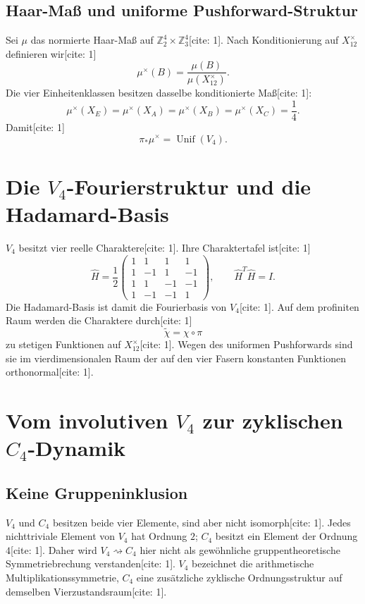 \documentclass[11pt,a4paper]{article}
\newcommand{\ZZ}{\mathbb{Z}}
\newcommand{\Unif}{\operatorname{Unif}}
\begin{document}
	\subsection{Haar-Maß und uniforme Pushforward-Struktur}
	Sei $\mu$ das normierte Haar-Maß auf $\ZZ_2^4\times\ZZ_3^4$[cite: 1]. Nach Konditionierung auf $X_{12}^{\times}$ definieren wir[cite: 1]
	\[
	\mu^\times(B)=\frac{\mu(B)}{\mu(X_{12}^{\times})}.
	\]
	Die vier Einheitenklassen besitzen dasselbe konditionierte Maß[cite: 1]:
	\[
	\mu^\times(X_E)=\mu^\times(X_A)=\mu^\times(X_B)=\mu^\times(X_C)=\frac14.
	\]
	Damit[cite: 1]
	\[
	\boxed{\pi_*\mu^\times=\Unif(V_4).}
	\]
	
	\section{Die $V_4$-Fourierstruktur und die Hadamard-Basis}
	$V_4$ besitzt vier reelle Charaktere[cite: 1]. Ihre Charaktertafel ist[cite: 1]
	\[
	\widehat H=\frac12
	\begin{pmatrix}
		1&1&1&1\\
		1&-1&1&-1\\
		1&1&-1&-1\\
		1&-1&-1&1
	\end{pmatrix},\qquad \widehat H^T\widehat H=I.
	\]
	Die Hadamard-Basis ist damit die Fourierbasis von $V_4$[cite: 1]. Auf dem profiniten Raum werden die Charaktere durch[cite: 1]
	\[
	\widetilde\chi=\chi\circ\pi
	\]
	zu stetigen Funktionen auf $X_{12}^{\times}$[cite: 1]. Wegen des uniformen Pushforwards sind sie im vierdimensionalen Raum der auf den vier Fasern konstanten Funktionen orthonormal[cite: 1].
	
	\section{Vom involutiven $V_4$ zur zyklischen $C_4$-Dynamik}
	\subsection{Keine Gruppeninklusion}
	$V_4$ und $C_4$ besitzen beide vier Elemente, sind aber nicht isomorph[cite: 1]. Jedes nichttriviale Element von $V_4$ hat Ordnung $2$; $C_4$ besitzt ein Element der Ordnung $4$[cite: 1]. Daher wird $V_4\rightsquigarrow C_4$ hier nicht als gewöhnliche gruppentheoretische Symmetriebrechung verstanden[cite: 1]. $V_4$ bezeichnet die arithmetische Multiplikationssymmetrie, $C_4$ eine zusätzliche zyklische Ordnungsstruktur auf demselben Vierzustandsraum[cite: 1].
	
\end{document}
